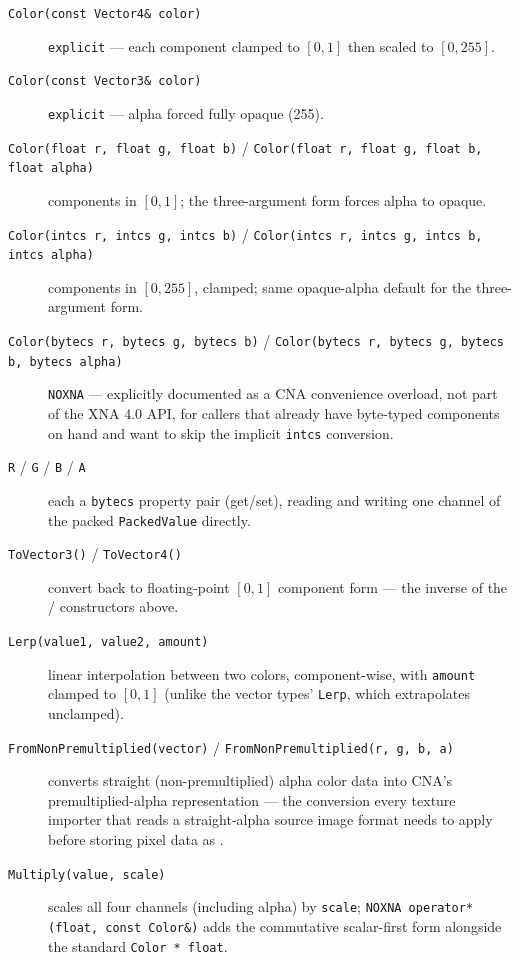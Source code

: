 \begin{description}
\item[\texttt{Color(const Vector4\& color)}] \texttt{explicit} --- each component clamped to
  $[0,1]$ then scaled to $[0,255]$.
\item[\texttt{Color(const Vector3\& color)}] \texttt{explicit} --- alpha forced fully opaque
  (255).
\item[\texttt{Color(float r, float g, float b)} / \texttt{Color(float r, float g, float b,
  float alpha)}] components in $[0,1]$; the three-argument form forces alpha to opaque.
\item[\texttt{Color(intcs r, intcs g, intcs b)} / \texttt{Color(intcs r, intcs g, intcs b,
  intcs alpha)}] components in $[0,255]$, clamped; same opaque-alpha default for the
  three-argument form.
\item[\texttt{Color(bytecs r, bytecs g, bytecs b)} / \texttt{Color(bytecs r, bytecs g, bytecs
  b, bytecs alpha)}] \texttt{NOXNA} --- explicitly documented as a CNA convenience overload,
  not part of the XNA 4.0 API, for callers that already have byte-typed components on hand and
  want to skip the implicit \texttt{intcs} conversion.
\item[\texttt{R} / \texttt{G} / \texttt{B} / \texttt{A}] each a \texttt{bytecs} property pair
  (get/set), reading and writing one channel of the packed \texttt{PackedValue} directly.
\item[\texttt{ToVector3()} / \texttt{ToVector4()}] convert back to floating-point $[0,1]$
  component form --- the inverse of the  /  constructors
  above.
\item[\texttt{Lerp(value1, value2, amount)}] linear interpolation between two colors,
  component-wise, with \texttt{amount} clamped to $[0,1]$ (unlike the vector types'
  \texttt{Lerp}, which extrapolates unclamped).
\item[\texttt{FromNonPremultiplied(vector)} / \texttt{FromNonPremultiplied(r, g, b, a)}]
  converts straight (non-premultiplied) alpha color data into CNA's premultiplied-alpha
   representation --- the conversion every texture importer that reads a
  straight-alpha source image format needs to apply before storing pixel data as
  .
\item[\texttt{Multiply(value, scale)}] scales all four channels (including alpha) by
  \texttt{scale}; \texttt{NOXNA operator*(float, const Color\&)} adds the commutative
  scalar-first form alongside the standard \texttt{Color * float}.
\end{description}

